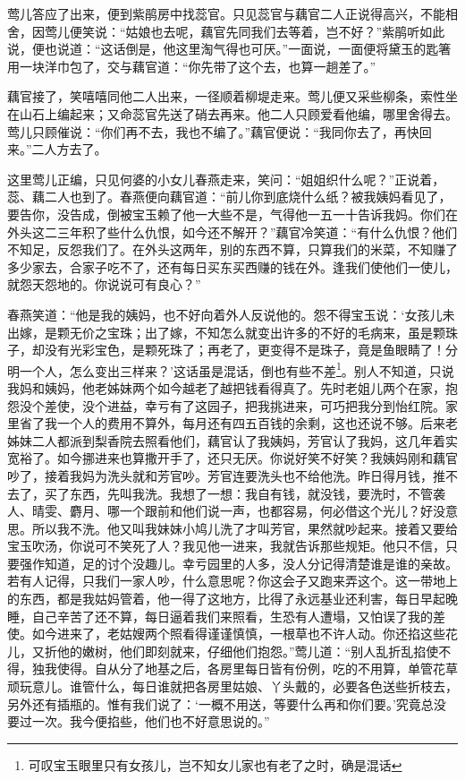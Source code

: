 \documentclass[12pt,oneside]{book}
\begin{document}
莺儿答应了出来，便到紫鹃房中找蕊官。只见蕊官与藕官二人正说得高兴，不能相舍，因莺儿便笑说：“姑娘也去呢，藕官先同我们去等着，岂不好？”紫鹃听如此说，便也说道：“这话倒是，他这里淘气得也可厌。”一面说，一面便将黛玉的匙箸用一块洋巾包了，交与藕官道：“你先带了这个去，也算一趟差了。”

藕官接了，笑嘻嘻同他二人出来，一径顺着柳堤走来。莺儿便又采些柳条，索性坐在山石上编起来；又命蕊官先送了硝去再来。他二人只顾爱看他编，哪里舍得去。莺儿只顾催说：“你们再不去，我也不编了。”藕官便说：“我同你去了，再快回来。”二人方去了。

这里莺儿正编，只见何婆的小女儿春燕走来，笑问：“姐姐织什么呢？”正说着，蕊、藕二人也到了。春燕便向藕官道：“前儿你到底烧什么纸？被我姨妈看见了，要告你，没告成，倒被宝玉赖了他一大些不是，气得他一五一十告诉我妈。你们在外头这二三年积了些什么仇恨，如今还不解开？”藕官冷笑道：“有什么仇恨？他们不知足，反怨我们了。在外头这两年，别的东西不算，只算我们的米菜，不知赚了多少家去，合家子吃不了，还有每日买东买西赚的钱在外。逢我们使他们一使儿，就怨天怨地的。你说说可有良心？”

春燕笑道：“他是我的姨妈，也不好向着外人反说他的。怨不得宝玉说：‘女孩儿未出嫁，是颗无价之宝珠；出了嫁，不知怎么就变出许多的不好的毛病来，虽是颗珠子，却没有光彩宝色，是颗死珠了；再老了，更变得不是珠子，竟是鱼眼睛了！分明一个人，怎么变出三样来？’这话虽是混话，倒也有些不差\footnote{可叹宝玉眼里只有女孩儿，岂不知女儿家也有老了之时，确是混话}。别人不知道，只说我妈和姨妈，他老姊妹两个如今越老了越把钱看得真了。先时老姐儿两个在家，抱怨没个差使，没个进益，幸亏有了这园子，把我挑进来，可巧把我分到怡红院。家里省了我一个人的费用不算外，每月还有四五百钱的余剩，这也还说不够。后来老姊妹二人都派到梨香院去照看他们，藕官认了我姨妈，芳官认了我妈，这几年着实宽裕了。如今挪进来也算撒开手了，还只无厌。你说好笑不好笑？我姨妈刚和藕官吵了，接着我妈为洗头就和芳官吵。芳官连要洗头也不给他洗。昨日得月钱，推不去了，买了东西，先叫我洗。我想了一想：我自有钱，就没钱，要洗时，不管袭人、晴雯、麝月、哪一个跟前和他们说一声，也都容易，何必借这个光儿？好没意思。所以我不洗。他又叫我妹妹小鸠儿洗了才叫芳官，果然就吵起来。接着又要给宝玉吹汤，你说可不笑死了人？我见他一进来，我就告诉那些规矩。他只不信，只要强作知道，足的讨个没趣儿。幸亏园里的人多，没人分记得清楚谁是谁的亲故。若有人记得，只我们一家人吵，什么意思呢？你这会子又跑来弄这个。这一带地上的东西，都是我姑妈管着，他一得了这地方，比得了永远基业还利害，每日早起晚睡，自己辛苦了还不算，每日逼着我们来照看，生恐有人遭塌，又怕误了我的差使。如今进来了，老姑嫂两个照看得谨谨慎慎，一根草也不许人动。你还掐这些花儿，又折他的嫩树，他们即刻就来，仔细他们抱怨。”莺儿道：“别人乱折乱掐使不得，独我使得。自从分了地基之后，各房里每日皆有份例，吃的不用算，单管花草顽玩意儿。谁管什么，每日谁就把各房里姑娘、丫头戴的，必要各色送些折枝去，另外还有插瓶的。惟有我们说了：‘一概不用送，等要什么再和你们要。’究竟总没要过一次。我今便掐些，他们也不好意思说的。”
\end{document}
